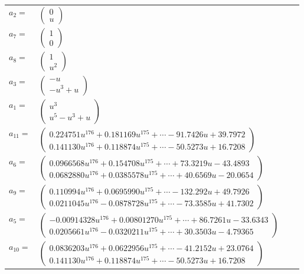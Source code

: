 \documentclass[1p]{elsarticle_modified}
\theoremstyle{definition}
\begin{document}
\begin{tabular}{m{7pt} m{180pt} m{7pt} m{180pt} }
\flushright $a_{2}=$&$\begin{pmatrix}0\\u\end{pmatrix}$ \\
\flushright $a_{7}=$&$\begin{pmatrix}1\\0\end{pmatrix}$ \\
\flushright $a_{8}=$&$\begin{pmatrix}1\\u^2\end{pmatrix}$ \\
\flushright $a_{3}=$&$\begin{pmatrix}- u\\- u^3+u\end{pmatrix}$ \\
\flushright $a_{1}=$&$\begin{pmatrix}u^3\\u^5- u^3+u\end{pmatrix}$ \\
\flushright $a_{11}=$&$\begin{pmatrix}0.224751 u^{176}+0.181169 u^{175}+\cdots-91.7426 u+39.7972\\0.141130 u^{176}+0.118874 u^{175}+\cdots-50.5273 u+16.7208\end{pmatrix}$ \\
\flushright $a_{6}=$&$\begin{pmatrix}0.0966568 u^{176}+0.154708 u^{175}+\cdots+73.3219 u-43.4893\\0.0682880 u^{176}+0.0385578 u^{175}+\cdots+40.6569 u-20.0654\end{pmatrix}$ \\
\flushright $a_{9}=$&$\begin{pmatrix}0.110994 u^{176}+0.0695990 u^{175}+\cdots-132.292 u+49.7926\\0.0211045 u^{176}-0.0878728 u^{175}+\cdots-73.3585 u+41.7302\end{pmatrix}$ \\
\flushright $a_{5}=$&$\begin{pmatrix}-0.00914328 u^{176}+0.00801270 u^{175}+\cdots+86.7261 u-33.6343\\0.0205661 u^{176}-0.0320211 u^{175}+\cdots+30.3503 u-4.79365\end{pmatrix}$ \\
\flushright $a_{10}=$&$\begin{pmatrix}0.0836203 u^{176}+0.0622956 u^{175}+\cdots-41.2152 u+23.0764\\0.141130 u^{176}+0.118874 u^{175}+\cdots-50.5273 u+16.7208\end{pmatrix}$ \\

\end{tabular}
\end{document}
